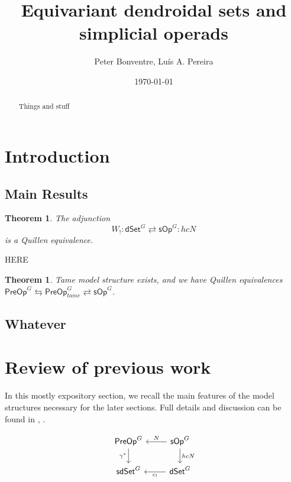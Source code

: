 \documentclass[a4paper,10pt
,draft
]{article}%
\title{Equivariant dendroidal sets and simplicial operads}
\author{Peter Bonventre, Lu\'is A. Pereira}%
\date{\today}
\numberwithin{equation}{section}
\numberwithin{figure}{section}
\newtheorem{theorem}[equation]{Theorem}%
\theoremstyle{definition} %
\newcommand{\sOp}{\ensuremath{\mathsf{sOp}}}%
\newcommand{\dSet}{\mathsf{dSet}}
\newcommand{\1}{\ensuremath{\mathbbm 1}}%
\begin{document}
\maketitle

\begin{abstract}
      Things and stuff
\end{abstract}

\tableofcontents


\section{Introduction}



\subsection{Main Results}



\begin{theorem}\label{QE THM}
The adjunction
\[
W_! \colon \dSet^G \rightleftarrows \sOp^G \colon hcN
\] is a Quillen equivalence.
\end{theorem}


{\color{blue} HERE}



\begin{theorem}
	Tame model structure exists, and we have Quillen equivalences
	$\mathsf{PreOp}^G \leftrightarrows \mathsf{PreOp}^G_{tame} \rightleftarrows \sOp^G$.
\end{theorem}





\subsection{Whatever}






\newpage

\section{Review of previous work}

In this mostly expository section, we recall the main features of the model structures necessary for the later sections.
Full details and discussion can be found in \cite{Per18}, \cite{BP_edss}.

\[
      \begin{tikzcd}
            \mathsf{PreOp}^G \ar{d}[swap]{\gamma^{\**}}&
            \mathsf{sOp}^G \ar{l}[swap]{N} \ar{d}{hcN}
            \\
            \mathsf{sdSet}^G &
            \mathsf{dSet}^G \ar{l}{c_{!}}
      \end{tikzcd}
\]
\end{document}
